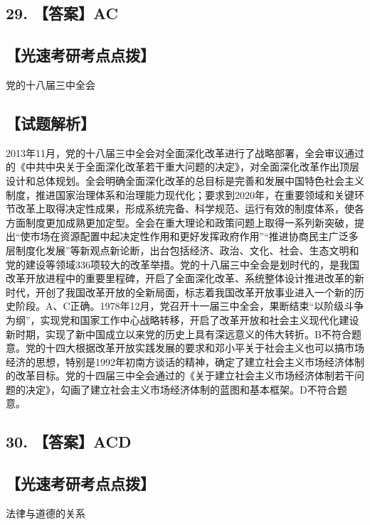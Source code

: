 \documentclass[UTF8,11pt]{ctexart}
\begin{document}
\subsection*{29. 【答案】AC}

\subsection*{【光速考研考点点拨】}

党的十八届三中全会


\subsection*{【试题解析】}

2013年11月，党的十八届三中全会对全面深化改革进行了战略部署，全会审议通过的《中共中央关于全面深化改革若干重大问题的决定》，对全面深化改革作出顶层设计和总体规划。全会明确全面深化改革的总目标是完善和发展中国特色社会主义制度，推进国家治理体系和治理能力现代化；要求到2020年，在重要领域和关键环节改革上取得决定性成果，形成系统完备、科学规范、运行有效的制度体系，使各方面制度更加成熟更加定型。全会在重大理论和政策问题上取得一系列新突破，提出“使市场在资源配置中起决定性作用和更好发挥政府作用”“推进协商民主广泛多层制度化发展”等新观点新论断，出台包括经济、政治、文化、社会、生态文明和党的建设等领域336项较大的改革举措。党的十八届三中全会是划时代的，是我国改革开放进程中的重要里程碑，开启了全面深化改革、系统整体设计推进改革的新时代，开创了我国改革开放的全新局面，标志着我国改革开放事业进入一个新的历史阶段。A、C正确。1978年12月，党召开十一届三中全会，果断结束“以阶级斗争为纲”，实现党和国家工作中心战略转移，开启了改革开放和社会主义现代化建设新时期，实现了新中国成立以来党的历史上具有深远意义的伟大转折。B不符合题意。党的十四大根据改革开放实践发展的要求和邓小平关于社会主义也可以搞市场经济的思想，特别是1992年初南方谈话的精神，确定了建立社会主义市场经济体制的改革目标。党的十四届三中全会通过的《关于建立社会主义市场经济体制若干问题的决定》，勾画了建立社会主义市场经济体制的蓝图和基本框架。D不符合题意。


\subsection*{30. 【答案】ACD}

\subsection*{【光速考研考点点拨】}

法律与道德的关系
\end{document}
